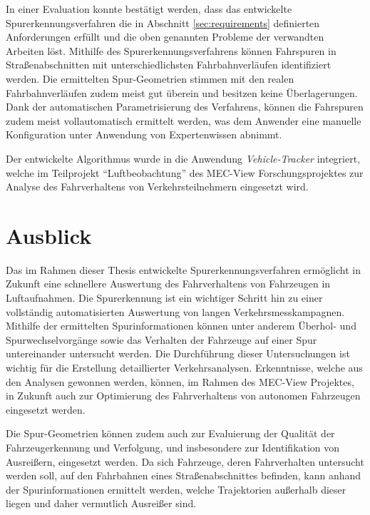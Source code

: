In einer Evaluation konnte bestätigt werden, dass das entwickelte Spurerkennungsverfahren die in Abschnitt
\ref{sec:requirements} definierten Anforderungen erfüllt und die oben genannten Probleme der verwandten Arbeiten löst.
Mithilfe des Spurerkennungsverfahrens können Fahrspuren in Straßenabschnitten mit unterschiedlichsten
Fahrbahnverläufen identifiziert werden. Die ermittelten Spur-Geometrien stimmen mit den realen Fahrbahnverläufen
zudem meist gut überein und besitzen keine Überlagerungen. Dank der automatischen Parametrisierung des Verfahrens,
können die Fahrspuren zudem meist vollautomatisch ermittelt werden, was dem Anwender eine manuelle Konfiguration
unter Anwendung von Expertenwissen abnimmt.

Der entwickelte Algorithmus wurde in die Anwendung \textit{Vehicle-Tracker} integriert,
welche im Teilprojekt ``Luftbeobachtung'' des MEC-View Forschungsprojektes zur Analyse des Fahrverhaltens
von Verkehrsteilnehmern eingesetzt wird.

\section{Ausblick}

Das im Rahmen dieser Thesis entwickelte Spurerkennungsverfahren ermöglicht in Zukunft eine schnellere Auswertung
des Fahrverhaltens von Fahrzeugen in Luftaufnahmen. Die Spurerkennung ist ein wichtiger Schritt hin zu einer
vollständig automatisierten Auswertung von langen Verkehrsmesskampagnen.
Mithilfe der ermittelten Spurinformationen können
unter anderem Überhol- und Spurwechselvorgänge sowie das Verhalten der Fahrzeuge auf einer Spur
untereinander untersucht werden. Die Durchführung dieser Untersuchungen ist wichtig für die Erstellung
detaillierter Verkehrsanalysen. Erkenntnisse, welche aus den Analysen gewonnen werden, können, im
Rahmen des MEC-View Projektes, in Zukunft auch zur Optimierung des Fahrverhaltens von autonomen
Fahrzeugen eingesetzt werden.

Die Spur-Geometrien können zudem auch zur Evaluierung der Qualität der Fahrzeugerkennung und Verfolgung,
und insbesondere zur Identifikation von Ausreißern, eingesetzt werden.
Da sich Fahrzeuge, deren Fahrverhalten untersucht werden soll, auf den Fahrbahnen eines Straßenabschnittes befinden,
kann anhand der Spurinformationen ermittelt werden, welche Trajektorien außerhalb dieser liegen und
daher vermutlich Ausreißer sind.

